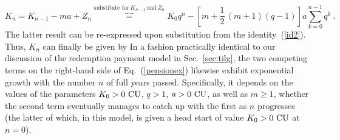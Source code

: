 %
\[
K_{n} = K_{n-1} - ma + Z_{n}
\overbrace{=}^{\text{substitute for}\ K_{n-1}
\ \text{and}\ Z_{n}} K_{0}q^{n}
- \left[m+\frac{1}{2}\,(m+1)(q-1)\right]a\sum_{k=0}^{n-1}q^{k} \ .
\]
%
The latter result can be re-expressed upon substitution from the 
identity~(\ref{id2}). Thus, $K_{n}$ can finally be given by
%
\be
{}
\ee
%
In a fashion practically identical to our discussion of the 
redemption payment model in Sec.~\ref{sec:tilg}, the two competing 
terms on the right-hand side of Eq.~(\ref{pensionex}) likewise 
exhibit exponential growth with the number $n$ of full years 
passed. Specifically, it depends on the values of the parameters 
$K_{0} > 0~{\rm CU}$, $q>1$, $a>0~{\rm CU}$, as well as $m \geq 1$,
whether the second term eventually manages to catch up with the 
first as $n$ progresses (the latter of which, in this model, is 
given a head start of value $K_{0} > 0~{\rm CU}$ at $n=0$).

